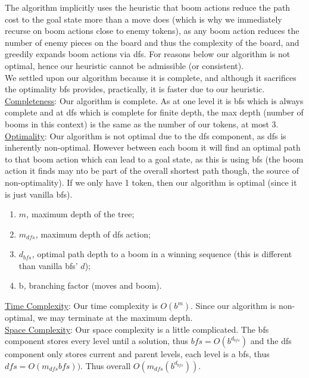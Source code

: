 \documentclass[fleqn]{article}
\begin{document}
\noindent The algorithm implicitly uses the heuristic that boom actions reduce the path cost to the goal state more than a move does (which is why we immediately recurse on boom actions close to enemy tokens), as any boom action reduces the number of enemy pieces on the board and thus the complexity of the board, and greedily expands boom actions via dfs. For reasons below our algorithm is not optimal, hence our heuristic cannot be admissible (or consistent).\\
	
	\noindent We settled upon our algorithm because it is complete, and although it sacrifices the optimality bfs provides, practically, it is faster due to our heuristic.\\
	
	\noindent \underline{Completeness}: Our algorithm is complete. As at one level it is bfs which is always complete and at dfs which is complete for finite depth, the max depth (number of booms in this context) is the same as the number of our tokens, at most 3.\\
	
	\noindent \underline{Optimality}: Our algorithm is not optimal due to the dfs component, as dfs is inherently non-optimal. However between each boom it will find an optimal path to that boom action which can lead to a goal state, as this is using bfs (the boom action it finds may nto be part of the overall shortest path though, the source of non-optimality). If we only have 1 token, then our algorithm is optimal (since it is just vanilla bfs).
	 \begin{enumerate}
		\item $m$\textit, maximum depth of the tree;
	 	\item $m_{dfs}$\textit, maximum depth of dfs action;
		\item $d_{bfs}$\textit, optimal path depth to a boom in a winning sequence (this is different than vanilla bfs' $d$);
	 	\item b\textit, branching factor (moves and boom).

	 \end{enumerate}
	
	\noindent \underline{Time Complexity}: Our time complexity is $O(b^m)$. Since our algorithm is non-optimal, we may terminate at the maximum depth.\\
	
	\noindent \underline{Space Complexity}: Our space complexity is a little complicated. The bfs component stores every level until a solution, thus $bfs = O(b^{d_{bfs}})$ and the dfs component only stores current and parent levels, each level is a bfs, thus $dfs = O(m_{dfs}bfs))$. Thus overall $O(m_{dfs}(b^{d_{bfs}})).$\\
\end{document}
